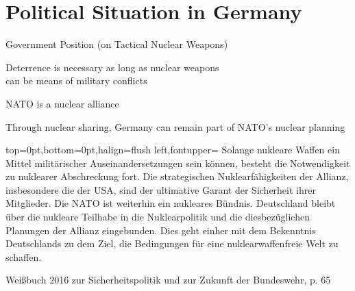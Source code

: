 \documentclass[presentation]{beamer}
\begin{document}
\section{Political Situation in Germany}
\label{sec:orgde7a51b}
\begin{frame}[label={sec:org79cf193}]{Government Position (on Tactical Nuclear Weapons)}
\small

Deterrence is necessary as long as nuclear weapons \\ can be means of military conflicts

NATO is a nuclear alliance

Through nuclear sharing, Germany can remain part of NATO's nuclear planning


\vspace{0.6cm}
\vfill

\begin{tornpagetb}[fill=white]{top=0pt,bottom=0pt,halign=flush left,fontupper=\tiny}
Solange nukleare Waffen ein Mittel militärischer Auseinandersetzungen sein können, besteht die Notwendigkeit zu nuklearer Abschreckung fort. Die strategischen Nuklearfähigkeiten der Allianz, insbesondere die
der USA, sind der ultimative Garant der Sicherheit ihrer Mitglieder. Die NATO ist weiterhin ein nukleares Bündnis. Deutschland bleibt über die nukleare Teilhabe in die Nuklearpolitik und die diesbezüglichen
Planungen der Allianz eingebunden. Dies geht einher mit dem Bekenntnis Deutschlands zu dem Ziel, die
Bedingungen für eine nuklearwaffenfreie Welt zu schaffen.
\end{tornpagetb}
\scriptsize 
\hfill Weißbuch 2016 zur Sicherheitspolitik und zur Zukunft der Bundeswehr, p. 65

\end{frame}
\end{document}
